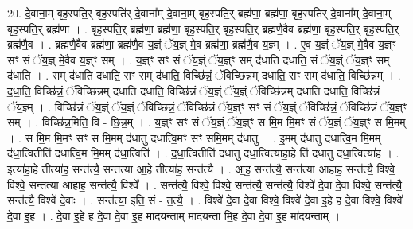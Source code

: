 \documentclass[17pt]{extarticle}
\begin{document}
20. दे॒वाना॒म् बृह॒स्पति॒र् बृह॒स्पति॑र् दे॒वाना᳚म् दे॒वाना॒म् बृह॒स्पति॒र् ब्रह्म॑णा॒ ब्रह्म॑णा॒ बृह॒स्पति॑र् दे॒वाना᳚म् दे॒वाना॒म् बृह॒स्पति॒र् ब्रह्म॑णा । . बृह॒स्पति॒र् ब्रह्म॑णा॒ ब्रह्म॑णा॒ बृह॒स्पति॒र् बृह॒स्पति॒र् ब्रह्म॑णै॒वैव ब्रह्म॑णा॒ बृह॒स्पति॒र् बृह॒स्पति॒र् ब्रह्म॑णै॒व । . ब्रह्म॑णै॒वैव ब्रह्म॑णा॒ ब्रह्म॑णै॒व य॒ज्ञ्ं ॅय॒ज्ञ् मे॒व ब्रह्म॑णा॒ ब्रह्म॑णै॒व य॒ज्ञ्म् । . ए॒व य॒ज्ञ्ं ॅय॒ज्ञ् मे॒वैव य॒ज्ञ्ꣳ सꣳ सं ॅय॒ज्ञ् मे॒वैव य॒ज्ञ्ꣳ सम् । . य॒ज्ञ्ꣳ सꣳ सं ॅय॒ज्ञ्ं ॅय॒ज्ञ्ꣳ सम् द॑धाति दधाति॒ सं ॅय॒ज्ञ्ं ॅय॒ज्ञ्ꣳ सम् द॑धाति । . सम् द॑धाति दधाति॒ सꣳ सम् द॑धाति॒ विच्छि॑न्नं॒ ॅविच्छि॑न्नम् दधाति॒ सꣳ सम् द॑धाति॒ विच्छि॑न्नम् । . द॒धा॒ति॒ विच्छि॑न्नं॒ ॅविच्छि॑न्नम् दधाति दधाति॒ विच्छि॑न्नं ॅय॒ज्ञ्ं ॅय॒ज्ञ्ं ॅविच्छि॑न्नम् दधाति दधाति॒ विच्छि॑न्नं ॅय॒ज्ञ्म् । . विच्छि॑न्नं ॅय॒ज्ञ्ं ॅय॒ज्ञ्ं ॅविच्छि॑न्नं॒ ॅविच्छि॑न्नं ॅय॒ज्ञ्ꣳ सꣳ सं ॅय॒ज्ञ्ं ॅविच्छि॑न्नं॒ ॅविच्छि॑न्नं ॅय॒ज्ञ्ꣳ सम् । . विच्छि॑न्न॒मिति॒ वि - छि॒न्न॒म् । . य॒ज्ञ्ꣳ सꣳ सं ॅय॒ज्ञ्ं ॅय॒ज्ञ्ꣳ स मि॒म मि॒मꣳ सं ॅय॒ज्ञ्ं ॅय॒ज्ञ्ꣳ स मि॒मम् । . स मि॒म मि॒मꣳ सꣳ स मि॒मम् द॑धातु दधात्वि॒मꣳ सꣳ समि॒मम् द॑धातु । . इ॒मम् द॑धातु दधात्वि॒म मि॒मम् द॑धा॒त्वितीति॑ दधात्वि॒म मि॒मम् द॑धा॒त्विति॑ । . द॒धा॒त्वितीति॑ दधातु दधा॒त्वित्या॑हा॒हे ति॑ दधातु दधा॒त्वित्या॑ह । . इत्या॑हा॒हे तीत्या॑ह॒ सन्त॑त्यै॒ सन्त॑त्या आ॒हे तीत्या॑ह॒ सन्त॑त्यै । . आ॒ह॒ सन्त॑त्यै॒ सन्त॑त्या आहाह॒ सन्त॑त्यै॒ विश्वे॒ विश्वे॒ सन्त॑त्या आहाह॒ सन्त॑त्यै॒ विश्वे᳚ । . सन्त॑त्यै॒ विश्वे॒ विश्वे॒ सन्त॑त्यै॒ सन्त॑त्यै॒ विश्वे॑ दे॒वा दे॒वा विश्वे॒ सन्त॑त्यै॒ सन्त॑त्यै॒ विश्वे॑ दे॒वाः । . सन्त॑त्या॒ इति॒ सं - त॒त्यै॒ । . विश्वे॑ दे॒वा दे॒वा विश्वे॒ विश्वे॑ दे॒वा इ॒हे ह दे॒वा विश्वे॒ विश्वे॑ दे॒वा इ॒ह । . दे॒वा इ॒हे ह दे॒वा दे॒वा इ॒ह मा॑दयन्ताम् मादयन्ता मि॒ह दे॒वा दे॒वा इ॒ह मा॑दयन्ताम् । \newline
\end{document}

